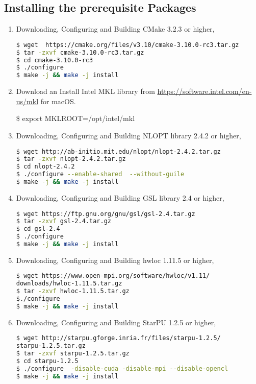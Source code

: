 \documentclass[
10pt, %
a4paper, %
oneside, %
headinclude,footinclude, %
BCOR5mm, %
]{scrartcl}
\begin{document}
\subsection{Installing the prerequisite Packages}
\begin{enumerate}
\item
\noindent Downloading, Configuring and Building CMake 3.2.3 or higher,
\begin{lstlisting}[language=bash]
$ wget  https://cmake.org/files/v3.10/cmake-3.10.0-rc3.tar.gz
$ tar -zxvf cmake-3.10.0-rc3.tar.gz
$ cd cmake-3.10.0-rc3
$ ./configure 
$ make -j && make -j install
\end{lstlisting}

\item

\noindent Download an Install Intel MKL library from \url{https://software.intel.com/en-us/mkl} for macOS.

\noindent \$ export MKLROOT=/opt/intel/mkl

\item
\noindent Downloading, Configuring and Building NLOPT library 2.4.2 or higher,
\begin{lstlisting}[language=bash]
$ wget http://ab-initio.mit.edu/nlopt/nlopt-2.4.2.tar.gz
$ tar -zxvf nlopt-2.4.2.tar.gz
$ cd nlopt-2.4.2
$ ./configure --enable-shared  --without-guile
$ make -j && make -j install
\end{lstlisting}

\item
\noindent Downloading, Configuring and Building GSL library 2.4 or higher,
\begin{lstlisting}[language=bash]
$ wget https://ftp.gnu.org/gnu/gsl/gsl-2.4.tar.gz
$ tar -zxvf gsl-2.4.tar.gz
$ cd gsl-2.4
$ ./configure 
$ make -j && make -j install
\end{lstlisting}

\item
\noindent Downloading, Configuring and Building hwloc 1.11.5 or higher,
\begin{lstlisting}[language=bash]
$ wget https://www.open-mpi.org/software/hwloc/v1.11/
downloads/hwloc-1.11.5.tar.gz
$ tar -zxvf hwloc-1.11.5.tar.gz
$./configure
$ make -j && make -j install
\end{lstlisting}

\item
\noindent Downloading, Configuring and Building StarPU 1.2.5 or higher,
\begin{lstlisting}[language=bash]
$ wget http://starpu.gforge.inria.fr/files/starpu-1.2.5/
starpu-1.2.5.tar.gz
$ tar -zxvf starpu-1.2.5.tar.gz
$ cd starpu-1.2.5
$ ./configure  -disable-cuda -disable-mpi --disable-opencl
$ make -j && make -j install
\end{lstlisting}



\end{enumerate}
\end{document}

